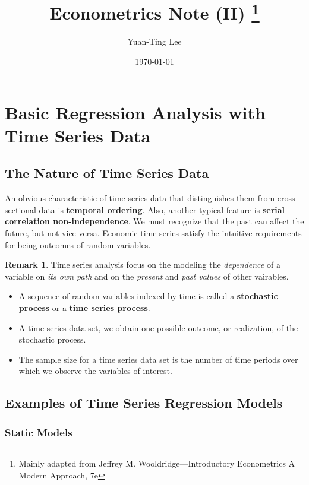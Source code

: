 \documentclass[a4paper, 10pt]{article}
\title{Econometrics Note (II) \footnote{Mainly adapted from Jeffrey M. Wooldridge—Introductory Econometrics A Modern Approach, 7e}}
\author{Yuan-Ting Lee}
\date{\today}
\theoremstyle{definition}	%
\newtheorem*{remark}{Remark}
\begin{document}
\maketitle

\section{Basic Regression Analysis with Time Series Data}
\subsection{The Nature of Time Series Data}

An obvious characteristic of time series data that distinguishes them from cross-sectional data is \textbf{temporal ordering}. Also, another typical feature is \textbf{serial correlation non-independence}. We must recognize that the past can affect the future, but not vice versa. Economic time series satisfy the intuitive requirements for being outcomes of random variables. 
\begin{remark} Time series analysis focus on the modeling the \textit{dependence} of a variable on \textit{its own path} and on the \textit{present} and \textit{past values} of other vairables.
    \begin{itemize}
        \item A sequence of random variables indexed by time is called a \textbf{stochastic process} or a \textbf{time series process}.
        \item A time series data set, we obtain one possible outcome, or realization, of the stochastic process.
        \item The sample size for a time series data set is the number of time periods over which we observe the variables of interest.
    \end{itemize}
\end{remark}

\subsection{Examples of Time Series Regression Models}
\subsubsection{Static Models}
\end{document}
